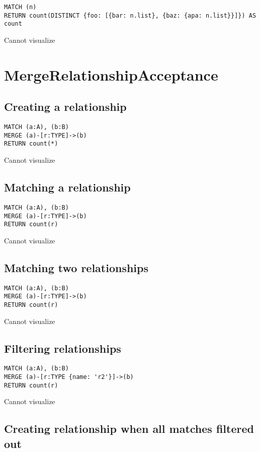 \begin{lstlisting}
MATCH (n)
RETURN count(DISTINCT {foo: [{bar: n.list}, {baz: {apa: n.list}}]}) AS count
\end{lstlisting}

Cannot visualize
\section{MergeRelationshipAcceptance}

\subsection{Creating a relationship}

\begin{lstlisting}
MATCH (a:A), (b:B)
MERGE (a)-[r:TYPE]->(b)
RETURN count(*)
\end{lstlisting}

Cannot visualize
\subsection{Matching a relationship}

\begin{lstlisting}
MATCH (a:A), (b:B)
MERGE (a)-[r:TYPE]->(b)
RETURN count(r)
\end{lstlisting}

Cannot visualize
\subsection{Matching two relationships}

\begin{lstlisting}
MATCH (a:A), (b:B)
MERGE (a)-[r:TYPE]->(b)
RETURN count(r)
\end{lstlisting}

Cannot visualize
\subsection{Filtering relationships}

\begin{lstlisting}
MATCH (a:A), (b:B)
MERGE (a)-[r:TYPE {name: 'r2'}]->(b)
RETURN count(r)
\end{lstlisting}

Cannot visualize
\subsection{Creating relationship when all matches filtered out}

